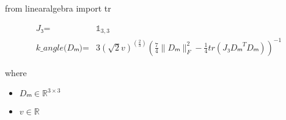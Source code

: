 \documentclass[12pt]{article}
\begin{document}
from linearalgebra import tr

\begin{align*}
\textit{J₃} = & \mathbb{ 1 }_{ 3,3 } \\
\textit{k\_angle(Dₘ)} = & 3\left(  \sqrt{2}\textit{v} \right)^{\left( \frac{2}{3} \right)}\left( \frac{7}{4}\|\textit{Dₘ}\|_F^{2} - \frac{1}{4}tr\left( \textit{J₃}\textit{Dₘ}^T\textit{Dₘ} \right) \right)^{-1}
\end{align*}

where
\begin{itemize}
\item $\textit{Dₘ} \in \mathbb{R}^{ 3 \times 3 }$
\item $\textit{v} \in \mathbb{{R}}$
\end{itemize}
\end{document}
